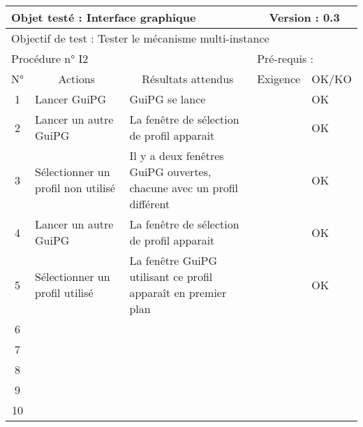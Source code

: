 \documentclass{../res/univ-projet}
\begin{document}
\begin{center}
    \begin{tabular}{|c|p{5cm}|p{5cm}|p{1.5cm}|p{1.5cm}|}
      \hline
      \multicolumn{3}{|l|}{Objet testé : Interface graphique} & \multicolumn{2}{c|}{Version : 0.3}\\ \hline
      \multicolumn{5}{|l|}{Objectif de test : Tester le mécanisme multi-instance}\\ \hline
      \multicolumn{3}{|l|}{Procédure n° I2} & \multicolumn{2}{p{3cm}|}{Pré-requis : }\\ \hline
      \multicolumn{1}{|c|}{N°} & \multicolumn{1}{c|}{Actions} & \multicolumn{1}{c|}{Résultats attendus} & 
      \multicolumn{1}{c|}{Exigence} & \multicolumn{1}{c|}{OK/KO}\\ \hline
      1 & Lancer GuiPG & GuiPG se lance &  & OK \\
      2 & Lancer un autre GuiPG & La fenêtre de sélection de profil apparait &  & OK \\
      3 & Sélectionner un profil non utilisé & Il y a deux fenêtres GuiPG ouvertes, chacune avec un profil différent &  & OK \\ 
      4 & Lancer un autre GuiPG & La fenêtre de sélection de profil apparait & & OK \\
      5 & Sélectionner un profil utilisé & La fenêtre GuiPG utilisant ce profil apparaît en premier plan &  & OK\\
      6 &  &  &  & \\
      7 &  &  &  & \\
      8 &  &  &  & \\
      9 &  &  &  & \\
      10 &  &  &  &\\ 
  \hline
    \end{tabular}
    \vskip 2.2cm


\end{center}
\end{document}
